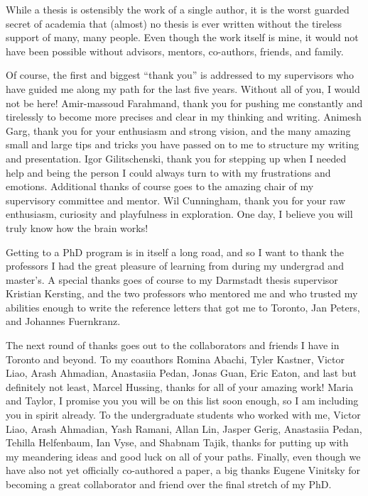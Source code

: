 While a thesis is ostensibly the work of a single author, it is the worst guarded secret of academia that (almost) no thesis is ever written without the tireless support of many, many people.
Even though the work itself is mine, it would not have been possible without advisors, mentors, co-authors, friends, and family.

Of course, the first and biggest ``thank you'' is addressed to my supervisors who have guided me along my path for the last five years.
Without all of you, I would not be here!
Amir-massoud Farahmand, thank you for pushing me constantly and tirelessly to become more precises and clear in my thinking and writing.
Animesh Garg, thank you for your enthusiasm and strong vision, and the many amazing small and large tips and tricks you have passed on to me to structure my writing and presentation.
Igor Gilitschenski, thank you for stepping up when I needed help and being the person I could always turn to with my frustrations and emotions.
Additional thanks of course goes to the amazing chair of my supervisory committee and mentor.
Wil Cunningham, thank you for your raw enthusiasm, curiosity and playfulness in exploration.
One day, I believe you will truly know how the brain works!

Getting to a PhD program is in itself a long road, and so I want to thank the professors I had the great pleasure of learning from during my undergrad and master's.
A special thanks goes of course to my Darmstadt thesis supervisor Kristian Kersting, and the two professors who mentored me and who trusted my abilities enough to write the reference letters that got me to Toronto, Jan Peters, and Johannes Fuernkranz.

The next round of thanks goes out to the collaborators and friends I have in Toronto and beyond.
To my coauthors Romina Abachi, Tyler Kastner, Victor Liao, Arash Ahmadian, Anastasiia Pedan, Jonas Guan, Eric Eaton, and last but definitely not least, Marcel Hussing, thanks for all of your amazing work!
Maria and Taylor, I promise you you will be on this list soon enough, so I am including you in spirit already.
To the undergraduate students who worked with me, Victor Liao, Arash Ahmadian, Yash Ramani, Allan Lin, Jasper Gerig, Anastasiia Pedan, Tehilla Helfenbaum, Ian Vyse, and Shabnam Tajik, thanks for putting up with my meandering ideas and good luck on all of your paths.
Finally, even though we have also not yet officially co-authored a paper, a big thanks Eugene Vinitsky for becoming a great collaborator and friend over the final stretch of my PhD.

